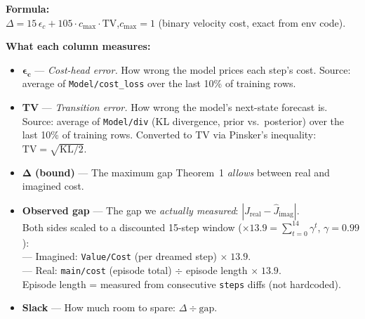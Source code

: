 \documentclass[10pt]{article}
\begin{document}
\vspace{1em}
\noindent\textbf{Formula:}\\
$\Delta = 15\,\epsilon_c + 105 \cdot c_{\max} \cdot \text{TV}$,\quad $c_{\max}=1$ (binary velocity cost, exact from env code).

\vspace{0.8em}
\noindent\textbf{What each column measures:}
\begin{itemize}\setlength\itemsep{0.3em}
  \item $\boldsymbol{\epsilon_c}$ --- \emph{Cost-head error.} How wrong the model prices each step's cost.
        Source: average of \texttt{Model/cost\_loss} over the last 10\% of training rows.
  \item \textbf{TV} --- \emph{Transition error.} How wrong the model's next-state forecast is.
        Source: average of \texttt{Model/div} (KL divergence, prior vs.\ posterior) over the last 10\% of training rows.
        Converted to TV via Pinsker's inequality: $\text{TV} = \sqrt{\text{KL}/2}$.
  \item $\boldsymbol{\Delta}$ \textbf{(bound)} --- The maximum gap Theorem~1 \emph{allows} between real and imagined cost.
  \item \textbf{Observed gap} --- The gap we \emph{actually measured}: $|J_{\text{real}} - \hat{J}_{\text{imag}}|$.\\
        Both sides scaled to a discounted 15-step window ($\times 13.9 = \sum_{t=0}^{14}\gamma^t$, $\gamma=0.99$):\\
        --- Imagined: \texttt{Value/Cost} (per dreamed step) $\times\;13.9$.\\
        --- Real: \texttt{main/cost} (episode total) $\div$ episode length $\times\;13.9$.\\
        Episode length = measured from consecutive \texttt{steps} diffs (not hardcoded).
  \item \textbf{Slack} --- How much room to spare: $\Delta \div \text{gap}$.
\end{itemize}
\end{document}
